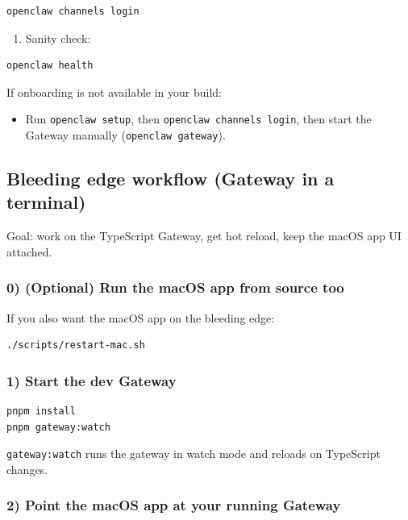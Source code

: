 \begin{lstlisting}[language=bash]
openclaw channels login
\end{lstlisting}


\begin{enumerate}
  \item Sanity check:
\end{enumerate}


\begin{lstlisting}[language=bash]
openclaw health
\end{lstlisting}


If onboarding is not available in your build:

\begin{itemize}
  \item Run \texttt{openclaw setup}, then \texttt{openclaw channels login}, then start the Gateway manually (\texttt{openclaw gateway}).
\end{itemize}


\subsection{Bleeding edge workflow (Gateway in a terminal)}


Goal: work on the TypeScript Gateway, get hot reload, keep the macOS app UI attached.

\subsubsection{0) (Optional) Run the macOS app from source too}


If you also want the macOS app on the bleeding edge:

\begin{lstlisting}[language=bash]
./scripts/restart-mac.sh
\end{lstlisting}


\subsubsection{1) Start the dev Gateway}


\begin{lstlisting}[language=bash]
pnpm install
pnpm gateway:watch
\end{lstlisting}


\texttt{gateway:watch} runs the gateway in watch mode and reloads on TypeScript changes.

\subsubsection{2) Point the macOS app at your running Gateway}


